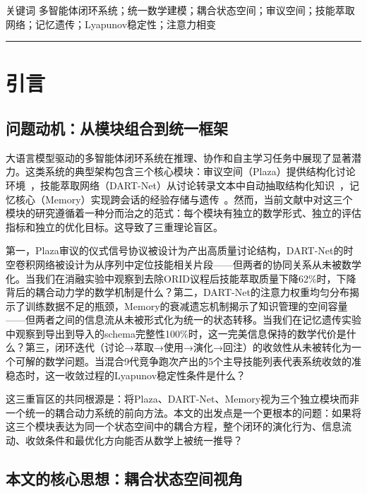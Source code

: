 \documentclass[twocolumn,10.5pt]{ctexart}
\begin{document}
\vspace{6pt}
{\heiti 关键词 \quad}{\kaishu 多智能体闭环系统；统一数学建模；耦合状态空间；审议空间；技能萃取网络；记忆遗传；Lyapunov稳定性；注意力相变}

\vspace{12pt}
\hrule
\vspace{12pt}

\section{引言}

\subsection{问题动机：从模块组合到统一框架}

大语言模型驱动的多智能体闭环系统在推理、协作和自主学习任务中展现了显著潜力。这类系统的典型架构包含三个核心模块：审议空间（Plaza）提供结构化讨论环境~\cite{gungor2025turquaz}，技能萃取网络（DART-Net）从讨论转录文本中自动抽取结构化知识~\cite{yu2022d2k,bai2018tcn}，记忆核心（Memory）实现跨会话的经验存储与遗传~\cite{sumers2023coala,wang2023voyager}。然而，当前文献中对这三个模块的研究遵循着一种分而治之的范式：每个模块有独立的数学形式、独立的评估指标和独立的优化目标。这导致了三重理论盲区。

第一，Plaza审议的仪式信号协议被设计为产出高质量讨论结构，DART-Net的时空卷积网络被设计为从序列中定位技能相关片段——但两者的协同关系从未被数学化。当我们在消融实验中观察到去除ORID议程后技能萃取质量下降62\%时，下降背后的耦合动力学的数学机制是什么？第二，DART-Net的注意力权重均匀分布揭示了训练数据不足的瓶颈，Memory的衰减遗忘机制揭示了知识管理的空间容量——但两者之间的信息流从未被形式化为统一的状态转移。当我们在记忆遗传实验中观察到导出到导入的schema完整性100\%时，这一完美信息保持的数学代价是什么？第三，闭环迭代（讨论→萃取→使用→演化→回注）的收敛性从未被转化为一个可解的数学问题。当混合9代竞争跑次产出的5个主导技能列表代表系统收敛的准稳态时，这一收敛过程的Lyapunov稳定性条件是什么？

这三重盲区的共同根源是：将Plaza、DART-Net、Memory视为三个独立模块而非一个统一的耦合动力系统的前向方法。本文的出发点是一个更根本的问题：如果将这三个模块表达为同一个状态空间中的耦合方程，整个闭环的演化行为、信息流动、收敛条件和最优化方向能否从数学上被统一推导？

\subsection{本文的核心思想：耦合状态空间视角}
\end{document}
